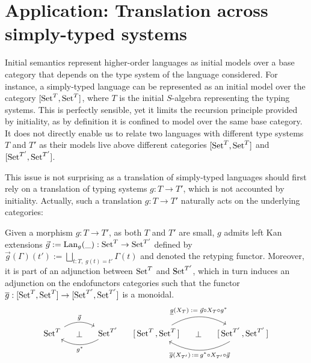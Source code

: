 \section{Application: Translation across simply-typed systems}

Initial semantics represent higher-order languages as initial models over a
base category that depends on the type system of the language considered.
For instance, a simply-typed language can be represented as an initial model
over the category $[\operatorname{Set}^T,\operatorname{Set}^T]$, where $T$ is the initial $S$-algebra
representing the typing systems.
This is perfectly sensible, yet it limits the recursion principle provided
by initiality, as by definition it is confined to model over the same base
category.
It does not directly enable us to relate two languages with different type
systems $T$ and $T'$ as their models live above different categories
$[\operatorname{Set}^T,\operatorname{Set}^T]$ and $[\operatorname{Set}^{T'},\operatorname{Set}^{T'}]$.

This issue is not surprising as a translation of simply-typed languages
should first rely on a translation of typing systems $g : T \to T'$,
which is not accounted by initiality.
Actually, such a translation $g : T \to T'$ naturally acts on the underlying
categories:

\begin{proposition}
  \label{prop:adj-type}
  Given a morphism $g : T \to T'$, as both $T$ and $T'$ are small, $g$ admits left Kan extensions
  $\vec{g} := \operatorname{Lan}_g(\_) : \operatorname{Set}^T \to \operatorname{Set}^{T'}$
  defined by $\vec{g}(\Gamma)(t') := \bigsqcup_{t : T,\; g(t) = t'} \Gamma(t)$
  and denoted the retyping functor.
  Moreover, it is part of an adjunction between $\operatorname{Set}^T$ and $\operatorname{Set}^{T'}$,
  which in turn induces an adjunction on the endofunctors categories such
  that the functor $\overline{g} : [\operatorname{Set}^T,\operatorname{Set}^T] \to [\operatorname{Set}^{T'},\operatorname{Set}^{T'}]$
  is a monoidal.
  \begin{align*}
    \begin{tikzcd}[ampersand replacement = \&, column sep=large]
      \Set^T \ar[r, bend left, "\vec{g}"] \ar[r, phantom, "\perp"]
        \& \Set^{T'} \ar[l, bend left, "g^*"]
    \end{tikzcd}
    &&
    \begin{tikzcd}[ampersand replacement = \&, column sep=large]
      {[}\Set^T{,}\Set^T{]} \ar[r, bend left, "\underline{g}(X_T) \;:=\; \vec{g} \circ X_T \circ g^*"]
                \ar[r, phantom, "\perp"]
        \& {[}\Set^{T'}{,}\Set^{T'}{]} \ar[l, bend left, "\overline{g}(X_{T'}) \,:=\, g^* \circ X_{T'} \circ \vec{g}"]
    \end{tikzcd}
  \end{align*}
\end{proposition}

